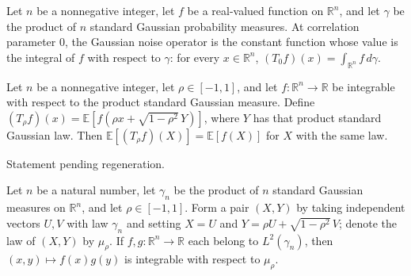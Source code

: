 \begin{theorem}
\label{BooleanAnalysis.GaussianSpace.gaussianNoise_zero}
\leanok
{}
Let $n$ be a nonnegative integer, let $f$ be a real-valued function on $\mathbb
R^n$, and let $\gamma$ be the product of $n$ standard Gaussian probability measures.
At correlation parameter $0$, the Gaussian noise operator is the constant function whose
value is the integral of $f$ with respect to $\gamma$: for every $x\in\mathbb R^n$,
$(T_0f)(x)=\int_{\mathbb R^n} f\,d\gamma$.
\end{theorem}

\begin{theorem}
\label{BooleanAnalysis.GaussianSpace.integral_gaussianNoise}
\leanok
{}
Let $n$ be a nonnegative integer, let $\rho\in[-1,1]$, and let $f:\mathbb R^n\to\mathbb
R$ be integrable with respect to the product standard Gaussian measure. Define $(T_\rho
f)(x)=\mathbb E[f(\rho x+\sqrt{1-\rho^2}\,Y)]$, where $Y$ has that product standard
Gaussian law. Then $\mathbb E[(T_\rho f)(X)]=\mathbb E[f(X)]$ for $X$ with the same law.
\end{theorem}

\begin{theorem}
\label{BooleanAnalysis.GaussianSpace.gaussianNoise_compose}
\leanok
{}
Statement pending regeneration.
\end{theorem}

\begin{lemma}
\label{BooleanAnalysis.GaussianSpace.integrable_correlatedGaussianMeasure_mul}
\leanok
{}
Let $n$ be a natural number, let $\gamma_n$ be the product of $n$ standard Gaussian
measures on $\mathbb R^n$, and let $\rho\in[-1,1]$. Form a pair $(X,Y)$ by taking
independent vectors $U,V$ with law $\gamma_n$ and setting $X=U$ and $Y=\rho
U+\sqrt{1-\rho^2}\,V$; denote the law of $(X,Y)$ by $\mu_\rho$. If $f,g:\mathbb
R^n\to\mathbb R$ each belong to $L^2(\gamma_n)$, then $(x,y)\mapsto f(x)g(y)$ is
integrable with respect to $\mu_\rho$.
\end{lemma}

